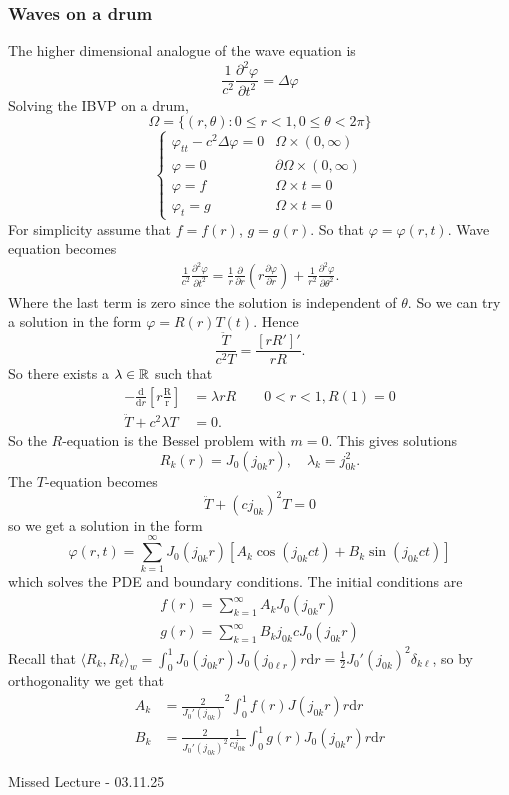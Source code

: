 \documentclass{article}
\begin{document}
\subsubsection{Waves on a drum}
The higher dimensional analogue of the wave equation is
\[
	\frac 1{c^2}\frac{\partial^2\varphi}{\partial t^2}=\Delta \varphi
\]
Solving the IBVP on a drum,
\[
	\Omega=\{(r,\theta): 0\le r < 1, 0\le \theta < 2\pi\}
\]
\[
  \begin{cases}
	  \varphi_{tt}-c^2\Delta \varphi=0 & \Omega\times (0,\infty)\\
	  \varphi=0 & \partial\Omega\times(0,\infty)\\
	  \varphi=f & \Omega\times{t=0}\\
	  \varphi_t=g & \Omega\times {t=0}
  \end{cases}
\]
For simplicity assume that $ f=f(r) $, $ g=g(r) $. So that $ \varphi=\varphi(r,t) $. Wave equation becomes
\begin{align*}
	\frac 1{c^2}\frac{\partial^2 \varphi}{\partial t^2}=\frac 1r\frac{\partial}{\partial r}\left(r\frac{\partial \varphi}{\partial r}\right)+\frac1{r^2}\frac{\partial^2 \varphi}{\partial \theta^2}.
\end{align*}
Where the last term is zero since the solution is independent of $ \theta $. So we can try a solution in the form $ \varphi=R(r)T(t) $. Hence
\[
	\frac{\ddot T}{c^2 T}=\frac{[rR']'}{rR}.
\]
So there exists a $ \lambda\in \mathbb{R} $ such that
\begin{align*}
	-\frac{\mathrm d}{\mathrm dr}\left[r\frac{\mathrm R}{\mathrm r}\right]&= \lambda rR \qquad 0<r < 1, R(1)=0\\
	\ddot T+c^2\lambda T &= 0.
\end{align*}
So the $ R $-equation is the Bessel problem with $ m=0 $. This gives solutions
\[
	R_k(r)=J_0(j_{0k}r),\quad\lambda_k=j_{0k}^2.
\]
The $ T $-equation becomes
\[
	\ddot T+(cj_{0k})^2T=0
\]
so we get a solution in the form
\[
	\varphi(r,t)=\sum_{k=1}^\infty J_0(j_{0k}r)\left[A_k\cos(j_{0k}ct)+B_k\sin(j_{0k}ct)\right]
\]
which solves the PDE and boundary conditions. The initial conditions are
\begin{align*}
	f(r)=\sum_{k=1}^\infty A_kJ_0(j_{0k}r)\\
	g(r)=\sum_{k=1}^\infty B_kj_{0k}cJ_0(j_{0k}r)
\end{align*}
Recall that $ \langle R_k,R_\ell\rangle_w=\int_0^1 J_0(j_{0k}r)J_0(j_{0\ell r})r\mathrm dr = \frac 12 J_0'(j_{0k})^2\delta_{k\ell} $, so by orthogonality we get that
\begin{align*}
	A_k&=\frac 2{J_0'(j_{0k})}^2\int_0^1f(r)J(j_{0k}r)r\mathrm dr\\
		B_k&=\frac 2{J_0'(j_{0k})^2}\frac 1{cj_{0k}}\int_0^1g(r)J_0(j_{0k}r)r\mathrm dr
\end{align*}
\par
Missed Lecture - 03.11.25
\par
\end{document}
